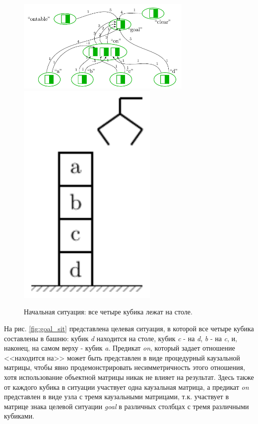 \documentclass[12pt]{scrartcl}
\begin{document}
	\begin{figure}
		\centering
		\includegraphics[width=0.75\textwidth,page=3]{examples/plan/plan_nets}
		\includegraphics[width=0.6\textwidth,page=2]{examples/plan/block_world}
		\caption{Начальная ситуация: все четыре кубика лежат на столе.}	
		\label{fig:start_sit}	
	\end{figure}
	
	На рис. \ref{fig:goal_sit} представлена целевая ситуация, в которой все четыре кубика составлены в башню: кубик \textit{d} находится на столе, кубик \textit{c} - на \textit{d}, \textit{b} - на \textit{c}, и, наконец, на самом верху - кубик \textit{a}. Предикат \textit{on}, который задает отношение <<находится на>> может быть представлен в виде процедурный каузальной матрицы, чтобы явно продемонстрировать несимметричность этого отношения, хотя использование объектной матрицы никак не влияет на результат. Здесь также от каждого кубика в ситуации участвует одна каузальная матрица, а предикат \textit{on} представлен в виде узла с тремя каузальными матрицами, т.к. участвует в матрице знака целевой ситуации \textit{goal} в различных столбцах с тремя различными кубиками.
\end{document}
